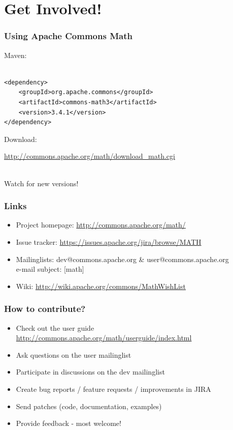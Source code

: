 \documentclass[14pt,mathserif]{beamer}
\begin{document}
\section[Getting involved]{Get Involved!}
\begin{frame}[fragile]
  \frametitle{Using Apache Commons Math}

Maven:

\begin{verbatim}

<dependency>
    <groupId>org.apache.commons</groupId>
    <artifactId>commons-math3</artifactId>
    <version>3.4.1</version>
</dependency>
\end{verbatim}

Download:\\
\begin{small}
\url{http://commons.apache.org/math/download_math.cgi} \\
\end{small}
\\
Watch for new versions!           
\end{frame}

\begin{frame}
  \frametitle{Links}

\begin{small}
\begin{itemize}
  \item Project homepage: \url{http://commons.apache.org/math/}
  \item Issue tracker: \url{https://issues.apache.org/jira/browse/MATH}
  \item Mailinglists: dev@commons.apache.org \& user@commons.apache.org \\
  e-mail subject: [math]
  \item Wiki: \url{http://wiki.apache.org/commons/MathWishList}
\end{itemize}
\end{small}
\end{frame}

\begin{frame}
  \frametitle{How to contribute?}

\begin{itemize}
  \item Check out the user guide \url{http://commons.apache.org/math/userguide/index.html}
  \item Ask questions on the user mailinglist
  \item Participate in discussions on the dev mailinglist
  \item Create bug reports / feature requests / improvements in JIRA
  \item Send patches (code, documentation, examples)
  \item Provide feedback - most welcome!
\end{itemize}

\end{frame}
\end{document}
